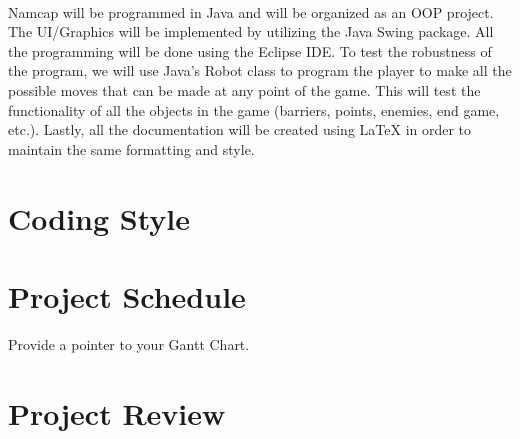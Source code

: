 \documentclass{article}
\begin{document}
\paragraph{}
Namcap will be programmed in Java and will be organized as an OOP project. The UI/Graphics will be implemented by utilizing the Java Swing package. All the programming will be done using the Eclipse IDE. To test the robustness of the program, we will use Java's Robot class to program the player to make all the possible moves that can be made at any point of the game. This will test the functionality of all the objects in the game (barriers, points, enemies, end game, etc.). Lastly, all the documentation will be created using LaTeX in order to maintain the same formatting and style.

\section{Coding Style}


\section{Project Schedule}

Provide a pointer to your Gantt Chart.

\section{Project Review}
\end{document}

